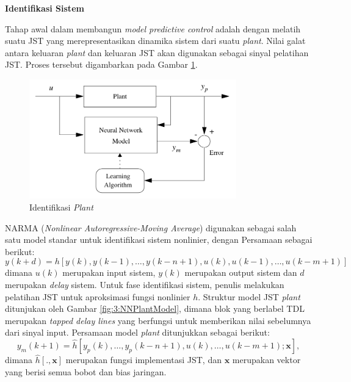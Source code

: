 \noindent \textbf{Identifikasi Sistem}

Tahap awal dalam membangun \textit{model predictive control} adalah dengan melatih suatu JST yang merepresentasikan dinamika sistem dari suatu \textit{plant}. Nilai galat antara keluaran \textit{plant} dan keluaran JST akan digunakan sebagai sinyal pelatihan JST. Proses tersebut digambarkan pada Gambar \ref{fig:3:plantidentification}.
\begin{figure}[!h]
	\centering
	\includegraphics[width=0.8\textwidth]{figures/PlantIdentification}
	\caption{Identifikasi \textit{Plant}}
	\label{fig:3:plantidentification}
\end{figure}

NARMA (\textit{Nonlinear Autoregressive-Moving Average}) digunakan sebagai salah satu model standar untuk identifikasi sistem nonlinier, dengan Persamaan sebagai berikut:
\begin{equation} \label{eq:3:NARMA}
y(k+d) = h[ y(k),y(k-1),\dots,y(k-n+1),u(k),u(k-1),\dots,u(k-m+1) ]
\end{equation}
dimana $u(k)$ merupakan input sistem, $y(k)$ merupakan output sistem dan $d$ merupakan \textit{delay} sistem. Untuk fase identifikasi sistem, penulis melakukan pelatihan JST untuk aproksimasi fungsi nonlinier $h$. Struktur model JST \textit{plant} ditunjukan oleh Gambar \ref{fig:3:NNPlantModel}, dimana blok yang berlabel TDL merupakan \textit{tapped delay lines} yang berfungsi untuk memberikan nilai sebelumnya dari sinyal input. Persamaan model \textit{plant} ditunjukkan sebagai berikut:
\begin{equation} \label{eq:3:plantmodel}
y_m(k+1) = \hat{h}[ y_p(k),\dots,y_p(k-n+1),u(k),\dots,u(k-m+1);\textbf{x} ] ,
\end{equation}
dimana $\hat{h}[.,\textbf{x}]$ merupakan fungsi implementasi JST, dan $\textbf{x} $ merupakan vektor yang berisi semua bobot dan bias jaringan. \\ \\

